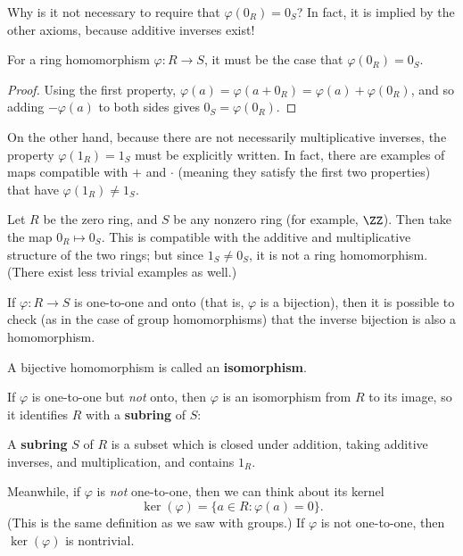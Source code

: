 Why is it not necessary to require that $\varphi(0_R) = 0_S$? In fact, it is implied by the other axioms, because additive inverses exist! 

\begin{proposition}
For a ring homomorphism $\varphi: R \to S$, it must be the case that $\varphi(0_R) = 0_S$. 
\end{proposition}

\begin{proof}
Using the first property, $\varphi(a) = \varphi(a + 0_R) = \varphi(a) + \varphi(0_R)$, and so adding $-\varphi(a)$ to both sides gives $0_S = \varphi(0_R)$.
\end{proof}

On the other hand, because there are not necessarily multiplicative inverses, the property $\varphi(1_R) = 1_S$ must be explicitly written. In fact, there are examples of maps compatible with $+$ and $\cdot$ (meaning they satisfy the first two properties) that have $\varphi(1_R) \neq 1_S$.

\begin{example}
Let $R$ be the zero ring, and $S$ be any nonzero ring (for example, $\ZZ$). Then take the map $0_R \mapsto 0_S$. This is compatible with the additive and multiplicative structure of the two rings; but since $1_S \neq 0_S$, it is not a ring homomorphism. (There exist less trivial examples as well.)
\end{example}

If $\varphi : R \to S$ is one-to-one and onto (that is, $\varphi$ is a bijection), then it is possible to check (as in the case of group homomorphisms) that the inverse bijection is also a homomorphism.

\begin{definition}
A bijective homomorphism is called an \textbf{isomorphism}.
\end{definition}

If $\varphi$ is one-to-one but \emph{not} onto, then $\varphi$ is an isomorphism from $R$ to its image, so it identifies $R$ with a \textbf{subring} of $S$:

\begin{definition}
A \textbf{subring} $S$ of $R$ is a subset which is closed under addition, taking additive inverses, and multiplication, and contains $1_R$. 
\end{definition}

Meanwhile, if $\varphi$ is \emph{not} one-to-one, then we can think about its kernel \[\ker(\varphi) = \{a \in R: \varphi(a) = 0\}.\] (This is the same definition as we saw with groups.) If $\varphi$ is not one-to-one, then $\ker(\varphi)$ is nontrivial. 

